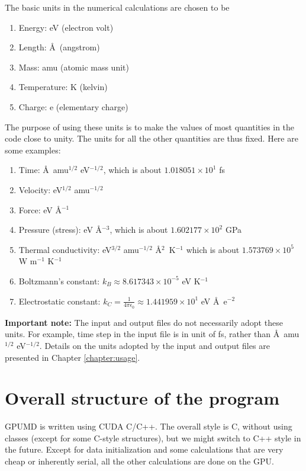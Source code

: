 \documentclass[12pt,a4paper]{report}
\begin{document}
The basic units in the numerical calculations are chosen to be
\begin{enumerate}
\item Energy: eV (electron volt)
\item Length: \AA~(angstrom)
\item Mass: amu (atomic mass unit)
\item Temperature: K (kelvin)
\item Charge: e (elementary charge)
\end{enumerate}
The purpose of using these units is to make the values of most quantities in the code close to unity. The units for all the other quantities are thus fixed. Here are some examples:
\begin{enumerate}
\item Time: \AA~amu$^{1/2}$ eV$^{-1/2}$, which is about $1.018051 \times 10^{1}$ fs
\item Velocity: eV$^{1/2}$ amu$^{-1/2}$
\item Force: eV \AA$^{-1}$
\item Pressure (stress): eV \AA$^{-3}$, which is about $1.602177 \times 10^{2}$ GPa
\item Thermal conductivity: eV$^{3/2}$ amu$^{-1/2}$ \AA$^{2}$~K$^{-1}$
      which is about $1.573769 \times 10^{5}$ W m$^{-1}$ K$^{-1}$
\item Boltzmann's constant: $k_B \approx 8.617343 \times 10^{-5}$ eV K$^{-1}$
\item Electrostatic constant:
$k_C = \frac{1}{4\pi\epsilon_0} \approx 1.441959 \times 10^{1}$ eV \AA~e$^{-2}$
\end{enumerate}

\textbf{Important note:}
The input and output files do not necessarily adopt these units. For example, time step in the input file is in unit of fs, rather than \AA~amu$^{1/2}$ eV$^{-1/2}$. Details on the units adopted by the input and output files are presented in Chapter \ref{chapter:usage}.


\section{Overall structure of the program}

GPUMD is written using CUDA C/C++. The overall style is C, without using classes (except for some C-style structures), but we might switch to C++ style in the future. Except for data initialization and some calculations that are very cheap or inherently serial, all the other calculations are done on the GPU.
\end{document}
